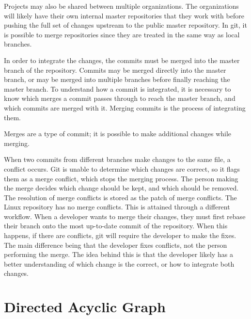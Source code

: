 Projects may also be shared between multiple organizations.
The organizations will likely have their own internal master
repositories that they work with before pushing the full set of
changes upstream to the public master repository.
In git, it is possible to merge repositories since they are treated in
the same way as local branches.

In order to integrate the changes, the commits must be merged into the
master branch of the repository.
Commits may be merged directly into the master branch, or may be merged
into multiple branches before finally reaching the master branch.
To understand how a commit is integrated, it is necessary to know which
merges a commit passes through to reach the master branch, and which
commits are merged with it.
Merging commits is the process of integrating them.

Merges are a type of commit; it is possible to make additional
changes while merging.

When two commits from different branches make changes to the same file,
a conflict occurs.
Git is unable to determine which changes are correct, so it flags them
as a merge conflict, which stops the merging process.
The person making the merge decides which change should be kept,
and which should be removed.
The resolution of merge conflicts is stored as the patch of merge
conflicts.
The Linux repository has no merge conflicts.
This is attained through a different workflow.
When a developer wants to merge their changes, they must first rebase
their branch onto the most up-to-date commit of the repository.
When this happens, if there are conflicts, git will require
the developer to make the fixes.
The main difference being that the developer fixes conflicts,
not the person performing the merge.
The idea behind this is that the developer likely has a better
understanding of which change is the correct, or how to integrate both
changes.

\section{Directed Acyclic Graph}
\label{sec:directed_acyclic_graph}

